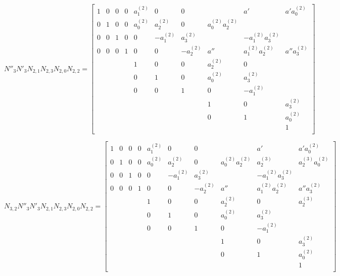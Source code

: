 \documentclass{article}
\begin{document}
\[
N''_3N'_3N_{2,1}N_{2,3}N_{2,0}N_{2,2}=
  \begin{bmatrix}
    1 & 0 & 0 & 0 & a_1^{(2)} & 0 & 0 &  & a' & a'a_0^{(2)} \\
    0 & 1 & 0 & 0 & a_0^{(2)} & a_2^{(2)} & 0 & a_0^{(2)}a_2^{(2)} &  &  \\
    0 & 0 & 1 & 0 & 0 & -a_1^{(2)} & a_3^{(2)} &  & -a_1^{(2)}a_3^{(2)} &  \\
    0 & 0 & 0 & 1 & 0 & 0 & -a_2^{(2)} & a'' & a_1^{(2)}a_2^{(2)} & a''a_3^{(2)} \\
    & & & & 1 & 0 & 0 & a_2^{(2)} & 0 &  \\
    & & & & 0 & 1 & 0 & a_0^{(2)} & a_3^{(2)} & \\
    & & & & 0 & 0 & 1 & 0 & -a_1^{(2)} &  \\
    & & & & & & & 1 & 0 & a_3^{(2)} \\
    & & & & & & & 0 & 1 & a_0^{(2)} \\
    & & & & & & & & & 1 \\
  \end{bmatrix}
\]

\[
N_{3,2}N''_3N'_3N_{2,1}N_{2,3}N_{2,0}N_{2,2}=
  \begin{bmatrix}
    1 & 0 & 0 & 0 & a_1^{(2)} & 0 & 0 &  & a' & a'a_0^{(2)} \\
    0 & 1 & 0 & 0 & a_0^{(2)} & a_2^{(2)} & 0 & a_0^{(2)}a_2^{(2)} & a_2^{(3)} & a_2^{(3)}a_0^{(2)} \\
    0 & 0 & 1 & 0 & 0 & -a_1^{(2)} & a_3^{(2)} &  & -a_1^{(2)}a_3^{(2)} &  \\
    0 & 0 & 0 & 1 & 0 & 0 & -a_2^{(2)} & a'' & a_1^{(2)}a_2^{(2)} & a''a_3^{(2)} \\
    & & & & 1 & 0 & 0 & a_2^{(2)} & 0 & a_2^{(3)} \\
    & & & & 0 & 1 & 0 & a_0^{(2)} & a_3^{(2)} & \\
    & & & & 0 & 0 & 1 & 0 & -a_1^{(2)} &  \\
    & & & & & & & 1 & 0 & a_3^{(2)} \\
    & & & & & & & 0 & 1 & a_0^{(2)} \\
    & & & & & & & & & 1 \\
  \end{bmatrix}
\]
\end{document}
